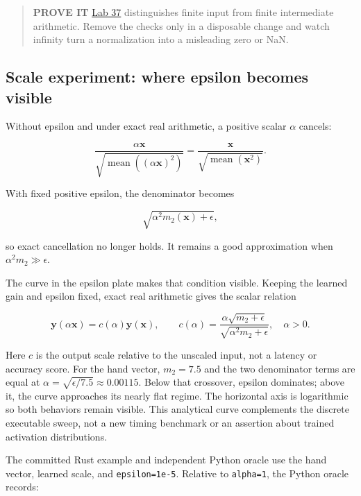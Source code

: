 \documentclass[
  10pt,
]{article}
\begin{document}
\begin{quote}
\textbf{PROVE IT}
\href{https://github.com/hermonai/inside-the-llm-engine/blob/astra-visual-rewrite/labs/lab-37-rmsnorm-magnitude-stress.md}{Lab
37} distinguishes finite input from finite intermediate arithmetic.
Remove the checks only in a disposable change and watch infinity turn a
normalization into a misleading zero or NaN.
\end{quote}

\subsection{Scale experiment: where epsilon becomes
visible}\label{scale-experiment-where-epsilon-becomes-visible}

Without epsilon and under exact real arithmetic, a positive scalar
\(\alpha\) cancels:

\[
\frac{\alpha\mathbf{x}}
{\sqrt{\operatorname{mean}((\alpha\mathbf{x})^2)}}
=
\frac{\mathbf{x}}
{\sqrt{\operatorname{mean}(\mathbf{x}^2)}}.
\]

With fixed positive epsilon, the denominator becomes

\[
\sqrt{\alpha^2m_2(\mathbf{x})+\epsilon},
\]

so exact cancellation no longer holds. It remains a good approximation
when \(\alpha^2m_2\gg\epsilon\).

The curve in the epsilon plate makes that condition visible. Keeping the
learned gain and epsilon fixed, exact real arithmetic gives the scalar
relation

\[
\mathbf{y}(\alpha\mathbf{x})=c(\alpha)\mathbf{y}(\mathbf{x}),\qquad
c(\alpha)=\frac{\alpha\sqrt{m_2+\epsilon}}
{\sqrt{\alpha^2m_2+\epsilon}},\quad \alpha>0.
\]

Here \(c\) is the output scale relative to the unscaled input, not a
latency or accuracy score. For the hand vector, \(m_2=7.5\) and the two
denominator terms are equal at
\(\alpha=\sqrt{\epsilon/7.5}\approx0.00115\). Below that crossover,
epsilon dominates; above it, the curve approaches its nearly flat
regime. The horizontal axis is logarithmic so both behaviors remain
visible. This analytical curve complements the discrete executable
sweep, not a new timing benchmark or an assertion about trained
activation distributions.

The committed Rust example and independent Python oracle use the hand
vector, learned scale, and \texttt{epsilon=1e-5}. Relative to
\texttt{alpha=1}, the Python oracle records:
\end{document}
